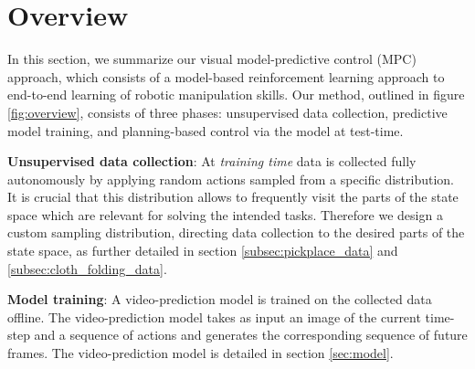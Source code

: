 \section{Overview}\label{sec:prelim}
\label{sec:vmpc}

In this section, we summarize our visual model-predictive control (MPC) approach, which consists of a model-based reinforcement learning approach to end-to-end learning of robotic manipulation skills. Our method, outlined in figure \ref{fig:overview}, consists of three phases: unsupervised data collection, predictive model training, and planning-based control via the model at test-time.

\textbf{Unsupervised data collection}: At \emph{training time} data is collected fully autonomously by applying random actions sampled from a specific distribution. It is crucial that this distribution allows to frequently visit the parts of the state space which are relevant for solving the intended tasks. Therefore we design a custom sampling distribution, directing data collection to the desired parts of the state space, as further detailed in section \ref{subsec:pickplace_data} and \ref{subsec:cloth_folding_data}.

\textbf{Model training}: A video-prediction model is trained on the collected data offline. The video-prediction model takes as input an image of the current time-step and a sequence of actions and generates the corresponding sequence of future frames. The video-prediction model is detailed in section \ref{sec:model}.


